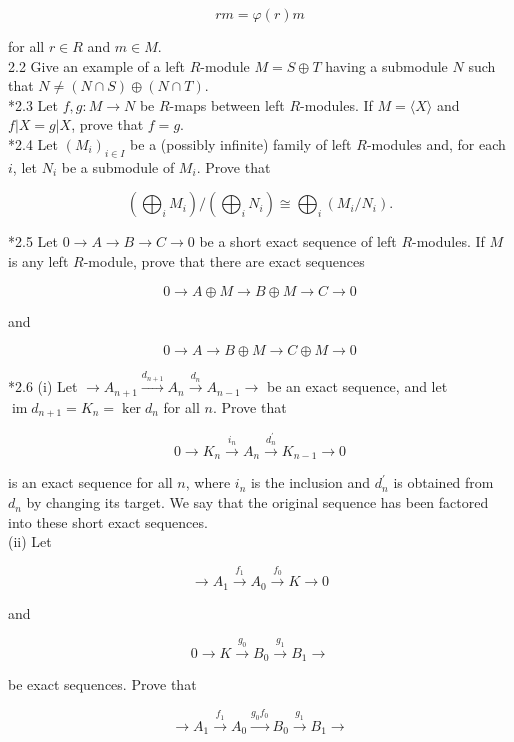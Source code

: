 \documentclass[10pt, letterpaper]{article}
\begin{document}
$$
r m=\varphi(r) m
$$

for all $r \in R$ and $m \in M$.\\
2.2 Give an example of a left $R$-module $M=S \oplus T$ having a submodule $N$ such that $N \neq(N \cap S) \oplus(N \cap T)$.\\
*2.3 Let $f, g: M \rightarrow N$ be $R$-maps between left $R$-modules. If $M=\langle X\rangle$ and $f|X=g| X$, prove that $f=g$.\\
*2.4 Let $\left(M_{i}\right)_{i \in I}$ be a (possibly infinite) family of left $R$-modules and, for each $i$, let $N_{i}$ be a submodule of $M_{i}$. Prove that

$$
\left(\bigoplus_{i} M_{i}\right) /\left(\bigoplus_{i} N_{i}\right) \cong \bigoplus_{i}\left(M_{i} / N_{i}\right) .
$$

*2.5 Let $0 \rightarrow A \rightarrow B \rightarrow C \rightarrow 0$ be a short exact sequence of left $R$-modules. If $M$ is any left $R$-module, prove that there are exact sequences

$$
0 \rightarrow A \oplus M \rightarrow B \oplus M \rightarrow C \rightarrow 0
$$

and

$$
0 \rightarrow A \rightarrow B \oplus M \rightarrow C \oplus M \rightarrow 0
$$

*2.6 (i) Let $\rightarrow A_{n+1} \xrightarrow{d_{n+1}} A_{n} \xrightarrow{d_{n}} A_{n-1} \rightarrow$ be an exact sequence, and let $\operatorname{im} d_{n+1}=K_{n}=\operatorname{ker} d_{n}$ for all $n$. Prove that

$$
0 \rightarrow K_{n} \xrightarrow{i_{n}} A_{n} \xrightarrow{d_{n}^{\prime}} K_{n-1} \rightarrow 0
$$

is an exact sequence for all $n$, where $i_{n}$ is the inclusion and $d_{n}^{\prime}$ is obtained from $d_{n}$ by changing its target. We say that the original sequence has been factored into these short exact sequences.\\
(ii) Let

$$
\rightarrow A_{1} \xrightarrow{f_{1}} A_{0} \xrightarrow{f_{0}} K \rightarrow 0
$$

and

$$
0 \rightarrow K \xrightarrow{g_{0}} B_{0} \xrightarrow{g_{1}} B_{1} \rightarrow
$$

be exact sequences. Prove that

$$
\rightarrow A_{1} \xrightarrow{f_{1}} A_{0} \xrightarrow{g_{0} f_{0}} B_{0} \xrightarrow{g_{1}} B_{1} \rightarrow
$$
\end{document}
